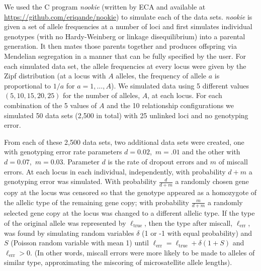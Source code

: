 We used the C program {\em nookie} (written by ECA and available at \url{https://github.com/eriqande/nookie}) to simulate each of the data sets.  
{\em nookie} is given a set of allele frequencies at a number of loci and first simulates individual 
genotypes (with no Hardy-Weinberg or linkage disequilibrium) into a parental generation.  It then mates 
those parents together and produces offspring via Mendelian segregation in a manner that can be fully 
specified by the user.  For each simulated data set, the allele frequencies at every locus were given 
by the Zipf distribution (at a locus with $A$ alleles, the frequency of allele $a$ is proportional to 
$1/a$ for $a=1,\ldots,A$). We simulated data using 5 different values $(5,10,15,20,25)$ for the number 
of alleles, $A$, at each locus. For each combination of the 5 values of $A$ and the 10 relationship 
configurations we simulated 50 data sets (2,500 in total)  with 25 unlinked loci and no genotyping 
error.  

From each of these 2,500 data sets, two additional data sets were created, one with genotyping error 
rate parameters $d=0.02$,~$m=.01$ and the other with $d=0.07$,~$m=0.03$.  Parameter $d$ is the rate of dropout 
errors and $m$ of miscall errors.  At each locus in each individual, independently, with probability $d
+m$ a genotyping error was simulated. With probability $\frac{d}{d+m}$ a randomly chosen gene copy at 
the locus was censored so that the genotype appeared as a homozygote of the allelic type of the 
remaining gene copy; with probability $\frac{m}{d+m}$ a randomly selected gene copy at the locus was 
changed to a different allelic type.  If the type of the original allele was represented by $\ell_
\mathrm{true}$, then the type after miscall, $\ell_\mathrm{err}$, was found by simulating random 
variables $\delta$ (1 or -1 with equal probability) and $S$ (Poisson random variable with mean 1) until 
$\ell_\mathrm{err} = \ell_\mathrm{true}+\delta(1+S)$ and $\ell_\mathrm{err}>0$. (In other words, 
miscall errors were more likely to be made to alleles of similar type, approximating the miscoring of 
microsatellite allele lengths).  

